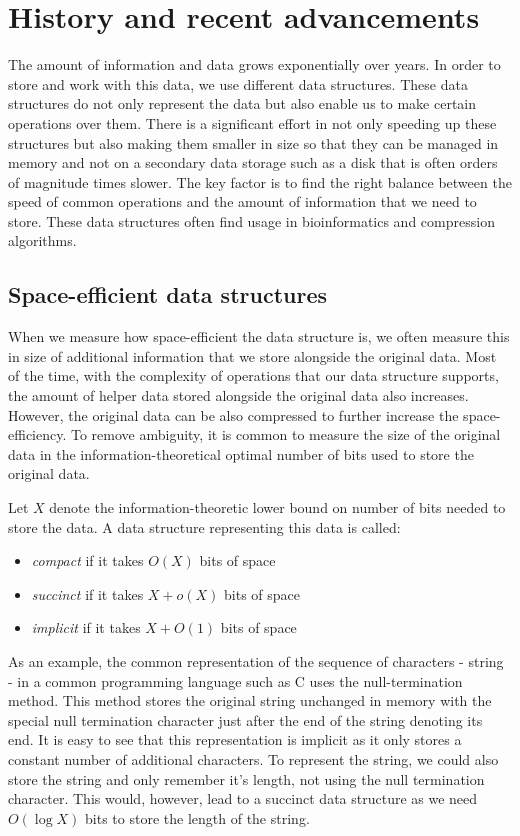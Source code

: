 \chapter{History and recent advancements}
\label{kap:kap1}

The amount of information and data grows exponentially over years. In order to store and work with this data, we use different data structures. These data structures do not only represent the data but also enable us to make certain operations over them. There is a significant effort in not only speeding up these structures but also making them smaller in size so that they can be managed in memory and not on a secondary data storage such as a disk that is often orders of magnitude times slower. The key factor is to find the right balance between the speed of common operations and the amount of information that we need to store. These data structures often find usage in bioinformatics and compression algorithms.

\section{Space-efficient data structures}

When we measure how space-efficient the data structure is, we often measure this in size of additional information that we store alongside the original data. Most of the time, with the complexity of operations that our data structure supports, the amount of helper data stored alongside the original data also increases. However, the original data can be also compressed to further increase the space-efficiency. To remove ambiguity, it is common to measure the size of the original data in the information-theoretical optimal number of bits used to store the original data.

\begin{definition}
Let $X$ denote the information-theoretic lower bound on number of bits needed to store the data. A data structure representing this data is called:
\begin{itemize}
    \item \emph{compact} if it takes $O(X)$ bits of space
    \item \emph{succinct} if it takes $X + o(X)$ bits of space
    \item \emph{implicit} if it takes $X + O(1)$ bits of space
\end{itemize}
\end{definition}

As an example, the common representation of the sequence of characters - string - in a common programming language such as C uses the null-termination method. This method stores the original string unchanged in memory with the special null termination character just after the end of the string denoting its end. It is easy to see that this representation is implicit as it only stores a constant number of additional characters. To represent the string, we could also store the string and only remember it's length, not using the null termination character. This would, however, lead to a succinct data structure as we need $O(\log X)$ bits to store the length of the string.

